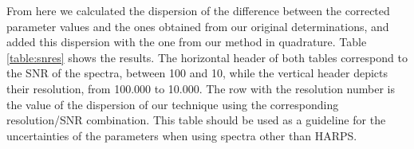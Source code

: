 \documentclass[referee]{aa}
\begin{document}
From here we calculated the dispersion of the difference between the corrected parameter values and the ones obtained from our original determinations, and added this dispersion with the one from our method in quadrature. Table \ref{table:snres} shows the results. The horizontal header of both tables correspond to the SNR of the spectra, between 100 and 10,  while the vertical header depicts their resolution, from 100.000 to 10.000. The row with the resolution number is the value of the dispersion of our technique using the corresponding resolution/SNR combination. This table should be used as a guideline for the uncertainties of the parameters when using spectra other than HARPS.

\begin{table}[]
\caption{Dispersion of the residuals of the parameters as a function of the resolution and SNR. }
\label{table:snres}
\begin{center}
\subtable[{[Fe/H]}]{
\begin{tabular}{l r r r r r r r r r r}


\end{tabular}}
\end{center}
\end{table}
\end{document}
